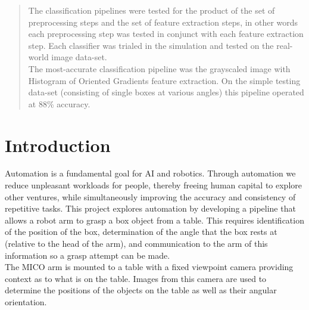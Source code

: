 \documentclass[letterpaper, 10 pt, conference]{conf/ieeeconf}  %
\begin{document}
\begin{abstract}

  The classification pipelines were tested for the product of the set of
  preprocessing steps and the set of feature extraction steps, in other words each
  preprocessing step was tested in conjunct with each feature extraction step.
  Each classifier was trialed in the simulation and tested on the real-world image
  data-set.\\

  The most-accurate classification pipeline was the grayscaled image with Histogram of Oriented Gradients feature extraction. On the simple testing data-set (consisting of single boxes
  at various angles) this pipeline operated at 88\% accuracy.
\end{abstract}



\section{Introduction}

Automation is a fundamental goal for AI and robotics. Through automation we
reduce unpleasant workloads for people, thereby freeing human capital to explore
other ventures, while simultaneously improving the accuracy and consistency of
repetitive tasks. This project explores automation by developing a pipeline that
allows a robot arm to grasp a box object from a table. This requires
identification of the position of the box, determination of the angle that the
box rests at (relative to the head of the arm), and communication to the arm of
this information so a grasp attempt can be made.\\

The MICO arm is mounted to a table with a fixed viewpoint camera providing
context as to what is on the table. Images from this camera are used to
determine the positions of the objects on the table as well as their angular
orientation.\\
\end{document}
